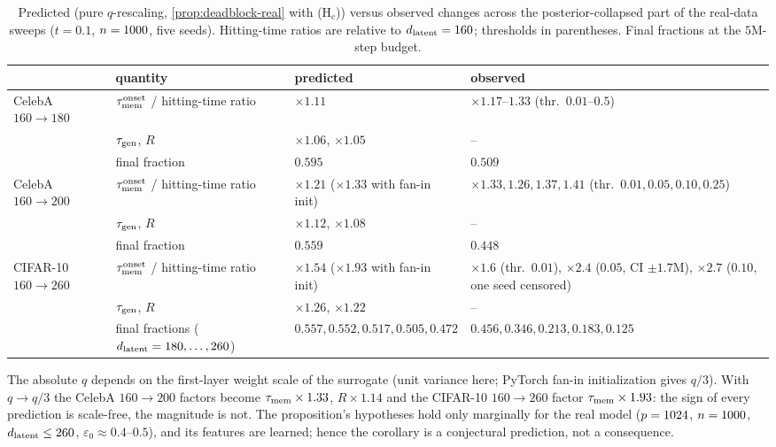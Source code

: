 \begin{table}[h]
\centering\small
\caption{Predicted (pure $q$-rescaling, \cref{prop:deadblock-real} with (H$_c$)) versus observed changes across the posterior-collapsed part of the real-data sweeps ($t=0.1$, $n=1000$, five seeds). Hitting-time ratios are relative to $d_{\mathrm{latent}}=160$; thresholds in parentheses. Final fractions at the $5$M-step budget.}
\label{tab:flatdeff-real}
\setlength{\tabcolsep}{3pt}
\begin{tabular}{p{.17\linewidth}p{.25\linewidth}p{.24\linewidth}p{.27\linewidth}}
\toprule
 & quantity & predicted & observed\\
\midrule
CelebA $160\to180$ & $\tau_{\mathrm{mem}}^{\rm onset}$ / hitting-time ratio & $\times1.11$ & $\times1.17$--$1.33$ (thr.\ $0.01$--$0.5$)\\
 & $\tau_{\mathrm{gen}}$, $R$ & $\times1.06$, $\times1.05$ & --\\
 & final fraction & $0.595$ & $0.509$\\
CelebA $160\to200$ & $\tau_{\mathrm{mem}}^{\rm onset}$ / hitting-time ratio & $\times1.21$ ($\times1.33$ with fan-in init) & $\times1.33,\allowbreak 1.26,\allowbreak 1.37,\allowbreak 1.41$ (thr.\ $0.01,\allowbreak 0.05,\allowbreak 0.10,\allowbreak 0.25$)\\
 & $\tau_{\mathrm{gen}}$, $R$ & $\times1.12$, $\times1.08$ & --\\
 & final fraction & $0.559$ & $0.448$\\
CIFAR-10 $160\to260$ & $\tau_{\mathrm{mem}}^{\rm onset}$ / hitting-time ratio & $\times1.54$ ($\times1.93$ with fan-in init) & $\times1.6$ (thr.\ $0.01$), $\times2.4$ ($0.05$, CI $\pm1.7$M), $\times2.7$ ($0.10$, one seed censored)\\
 & $\tau_{\mathrm{gen}}$, $R$ & $\times1.26$, $\times1.22$ & --\\
 & final fractions ($d_{\mathrm{latent}}=180,\dots,260$) & $0.557,\allowbreak 0.552,\allowbreak 0.517,\allowbreak 0.505,\allowbreak 0.472$ & $0.456,\allowbreak 0.346,\allowbreak 0.213,\allowbreak 0.183,\allowbreak 0.125$\\
\bottomrule
\end{tabular}
\end{table}
The absolute $q$ depends on the first-layer weight scale of the surrogate (unit variance here; PyTorch fan-in initialization gives $q/3$). With $q\to q/3$ the CelebA $160\to200$ factors become $\tau_{\mathrm{mem}}\times1.33$, $R\times1.14$ and the CIFAR-10 $160\to260$ factor $\tau_{\mathrm{mem}}\times1.93$: the sign of every prediction is scale-free, the magnitude is not. The proposition's hypotheses hold only marginally for the real model ($p=1024$, $n=1000$, $d_{\mathrm{latent}}\le260$, $\varepsilon_0\approx0.4$--$0.5$), and its features are learned; hence the corollary is a conjectural prediction, not a consequence.

